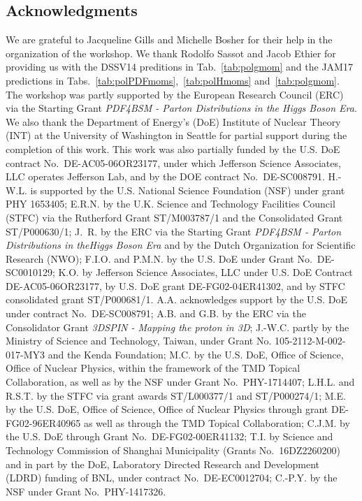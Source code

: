 \subsection*{Acknowledgments}

We are grateful to Jacqueline Gills and Michelle Bosher for their help in the
organization of the workshop.
%
We thank Rodolfo Sassot and Jacob Ethier for providing us with the 
DSSV14 preditions in Tab.~\ref{tab:polgmom} and the JAM17 predictions in
Tabs.~\ref{tab:polPDFmoms},~\ref{tab:polHmoms} and~\ref{tab:polgmom}.
%
The workshop was partly supported by the European Research Council (ERC) via 
the Starting Grant {\it PDF4BSM - Parton Distributions in the Higgs Boson Era}.
%
We also thank the Department of Energy's (DoE) Institute of Nuclear Theory 
(INT) at the University of Washington in Seattle for partial support during 
the completion of this work.
%
This work was also partially funded by the U.S. DoE contract 
No.~DE-AC05-06OR23177, under which Jefferson Science Associates, 
LLC operates Jefferson Lab, and by the DOE contract No.~DE-SC008791. 
% 
H.-W.L. is supported by the U.S. National Science Foundation (NSF) under grant 
PHY 1653405; E.R.N. by the U.K. Science and Technology Facilities Council 
(STFC) via the Rutherford Grant ST/M003787/1 and the Consolidated Grant 
ST/P000630/1; J.~R. by the ERC via the Starting 
Grant {\it PDF4BSM - Parton Distributions in theHiggs Boson Era} and by the 
Dutch Organization for Scientific Research (NWO); F.I.O. and P.M.N. 
by the U.S. DoE under 
Grant No.~DE-SC0010129; K.O. by Jefferson Science Associates, LLC under U.S. 
DoE Contract DE-AC05-06OR23177, by U.S. DoE grant DE-FG02-04ER41302, 
and  by STFC consolidated grant ST/P000681/1.
%
A.A. acknowledges support by the U.S. DoE under contract No.~DE-SC008791;
A.B. and G.B. by the ERC via the Consolidator Grant {\it 3DSPIN - Mapping the
proton in 3D};
J.-W.C. partly by the Ministry of Science and Technology, Taiwan,
under Grant No. 105-2112-M-002-017-MY3 and the Kenda Foundation;
M.C. by the U.S. DoE, Office of Science, Office of Nuclear Physics, within the 
framework of the TMD Topical Collaboration, as well as by the NSF under Grant 
No.~PHY-1714407;
L.H.L. and R.S.T. by the STFC via grant awards ST/L000377/1 and ST/P000274/1;
M.E. by the U.S. DoE, Office of Science, Office of Nuclear Physics through 
grant DE-FG02-96ER40965 as well as through the TMD Topical Collaboration;
C.J.M. by the U.S. DoE through Grant No.~DE-FG02-00ER41132;
T.I. by Science and Technology Commission of Shanghai Municipality 
(Grants No.~16DZ2260200) and in part by the DoE, Laboratory Directed Research 
and Development (LDRD) funding of BNL, under contract No.~DE-EC0012704;
C.-P.Y. by the NSF under Grant No.~PHY-1417326.



